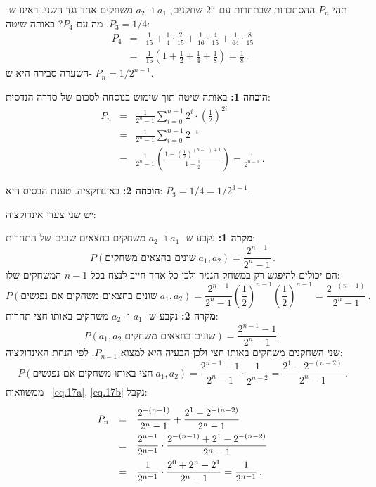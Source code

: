 
תהי 
$P_n$
ההסתברות שבתחרות עם 
$2^n$
שחקנים,
$a_1$
ו-%
$a_2$
משחקים אחד נגד השני. ראינו ש-%
$P_3=1/4$.
מה עם
$P_4$?
באותה שיטה:
\begin{eqnarray*}
P_4 &=& \frac{1}{15} + \frac{1}{4}\cdot \frac{2}{15}  + \frac{1}{16}\cdot \frac{4}{15}  + \frac{1}{64}\cdot \frac{8}{15} \\
&=&\frac{1}{15}\left(1+\frac{1}{2}+\frac{1}{4}+\frac{1}{8}\right)=\frac{1}{8}\,.
\end{eqnarray*}
השערה סבירה היא ש-%
$P_n=1/2^{n-1}$.

\textbf{הוכחה 1:}
באותה שיטה תוך שימוש בנוסחה לסכום של סדרה הנדסית:
\begin{eqnarray*}
P_n&=&\frac{1}{2^n-1}\sum_{i=0}^{n-1}2^i\cdot \left(\frac{1}{2}\right)^{2i}\\
&=&\frac{1}{2^n-1}\sum_{i=0}^{n-1}2^{-i}\\
&=&\frac{1}{2^n-1}
  \left(
    \frac{1-\left(\frac{1}{2}\right)^{(n-1)+1}}
         {1-\frac{1}{2}}
  \right)=\frac{1}{2^{n-1}}\,.
\end{eqnarray*}

\textbf{הוכחה 2:}
באינדוקציה. טענת הבסיס היא:
$P_3=1/4=1/2^{3-1}$.

יש שני צעדי אינדוקציה:

\textbf{מקרה 1:} 
נקבע ש-%
$a_1$
ו-%
$a_2$
משחקים בחצאים שונים של התחרות:
\[
P(\textrm{שונים בחצאים משחקים}\;a_1,a_2)=\frac{2^{n-1}}{2^n-1}\,.
\]
הם יכולים להיפגש רק במשחק הגמר ולכן כל אחד חייב לנצח בכל 
$n-1$
המשחקים שלו:
\begin{equation}\label{eq.17a}
P(\textrm{שונים בחצאים משחקים אם נפגשים}\; a_1,a_2)=\frac{2^{n-1}}{2^n-1} \left(\frac{1}{2}\right)^{n-1} \left(\frac{1}{2}\right)^{n-1}=\frac{2^{-(n-1)}}{2^n-1}\,.
\end{equation}
\textbf{מקרה 2:}
נקבע ש-%
$a_1$
ו-%
$a_2$
משחקים באותו חצי תחרות:
\[
P(a_1,a_2\;\textrm{שונים בחצאים משחקים})=\frac{2^{n-1}-1}{2^n-1}\,.
\]
שני השחקנים משחקים באותו חצי ולכן הבעיה היא למצוא
$P_{n-1}$.
לפי הנחת האינדוקציה:
\begin{equation}\label{eq.17b}
P(\textrm{חצי באותו משחקים אם נפגשים}\; a_1,a_2)=\frac{2^{n-1}-1}{2^n-1}\cdot \frac{1}{2^{n-2}}=\frac{2^{1}-2^{-(n-2)}}{2^n-1}\,.
\end{equation}
ממשוואות%
~\ref{eq.17a}, \ref{eq.17b}
נקבל:
\[
\renewcommand*{\arraystretch}{2.2}
\begin{array}{rcl}
P_n&=&\disfrac{2^{-(n-1)}}{2^n-1}+\disfrac{2^{1}-2^{-(n-2)}}{2^n-1}\\
&=&\disfrac{2^{n-1}}
        {2^{n-1}}\cdot 
   \disfrac{2^{-(n-1)}+2^{1}-2^{-(n-2)}}
        {2^n-1}\\
&=&\disfrac{1}
        {2^{n-1}}\cdot 
   \disfrac{2^0+2^n-2^1}
        {2^n-1}=\disfrac{1}{2^{n-1}}\,.
\end{array}
\]

